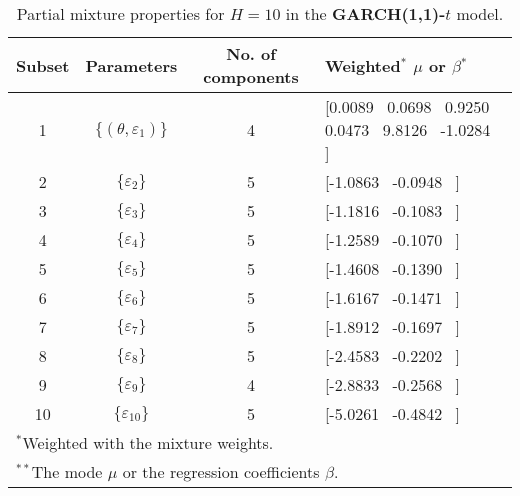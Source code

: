 \footnotesize{  
{ \renewcommand{\arraystretch}{1.3} 
\begin{longtable}{cccp{3.6cm}} 
\caption{Partial mixture properties for $H=10$ in the \textbf{GARCH(1,1)-$t$} model.} 
\label{tab:pmits_t_garch2_noS} \\ 
 Subset & Parameters & No. of components  & Weighted$^{*}$ $\mu$ or $\beta$$^{*}$ \\ \hline 
1 & $\{(\theta,\varepsilon_{1})\}$ & 4 & [0.0089 \, 0.0698 \, 0.9250 \, 0.0473 \, 9.8126 \, -1.0284 \, ]   \\ [1ex] 
2 & $\{\varepsilon_{2}\}$ & 5 & [-1.0863 \, -0.0948 \, ]   \\ [1ex] 
3 & $\{\varepsilon_{3}\}$ & 5 & [-1.1816 \, -0.1083 \, ]   \\ [1ex] 
4 & $\{\varepsilon_{4}\}$ & 5 & [-1.2589 \, -0.1070 \, ]   \\ [1ex] 
5 & $\{\varepsilon_{5}\}$ & 5 & [-1.4608 \, -0.1390 \, ]   \\ [1ex] 
6 & $\{\varepsilon_{6}\}$ & 5 & [-1.6167 \, -0.1471 \, ]   \\ [1ex] 
7 & $\{\varepsilon_{7}\}$ & 5 & [-1.8912 \, -0.1697 \, ]   \\ [1ex] 
8 & $\{\varepsilon_{8}\}$ & 5 & [-2.4583 \, -0.2202 \, ]   \\ [1ex] 
9 & $\{\varepsilon_{9}\}$ & 4 & [-2.8833 \, -0.2568 \, ]   \\ [1ex] 
10 & $\{\varepsilon_{10}\}$ & 5 & [-5.0261 \, -0.4842 \, ]   \\ [1ex] 
\hline 
 \multicolumn{4}{l}{\footnotesize{$^{*}$Weighted with the mixture weights.}} \\ 
 \multicolumn{4}{l}{\footnotesize{$^{**}$The mode $\mu$ or the regression coefficients $\beta$.}} \\ 
\end{longtable} 
} 
} 
